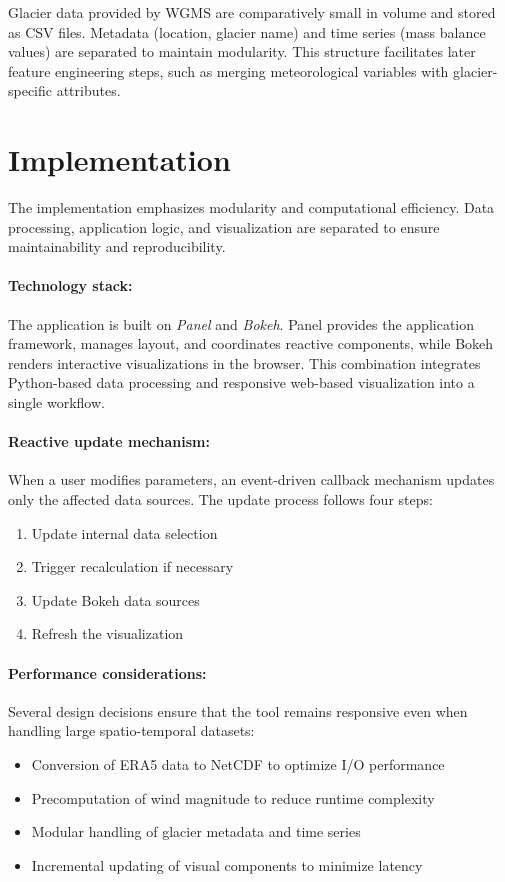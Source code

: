 Glacier data provided by WGMS are comparatively small in volume and stored as CSV files. Metadata (location, glacier name) and time series (mass balance values) are separated to maintain modularity. This structure facilitates later feature engineering steps, such as merging meteorological variables with glacier-specific attributes.





\section{Implementation}
\label{sec:visualization:implementation}

The implementation emphasizes modularity and computational efficiency. Data processing, application logic, and visualization are separated to ensure maintainability and reproducibility.

\paragraph{Technology stack:}
The application is built on \textit{Panel} and \textit{Bokeh}. Panel provides the application framework, manages layout, and coordinates reactive components, while Bokeh renders interactive visualizations in the browser. This combination integrates Python-based data processing and responsive web-based visualization into a single workflow.

\paragraph{Reactive update mechanism:}
When a user modifies parameters, an event-driven callback mechanism updates only the affected data sources. The update process follows four steps:
\begin{enumerate}
    \item Update internal data selection
    \item Trigger recalculation if necessary
    \item Update Bokeh data sources
    \item Refresh the visualization
\end{enumerate}


\paragraph{Performance considerations:}
Several design decisions ensure that the tool remains responsive even when handling large spatio-temporal datasets:
\begin{itemize}
    \item Conversion of ERA5 data to NetCDF to optimize I/O performance
    \item Precomputation of wind magnitude to reduce runtime complexity
    \item Modular handling of glacier metadata and time series
    \item Incremental updating of visual components to minimize latency
\end{itemize}



